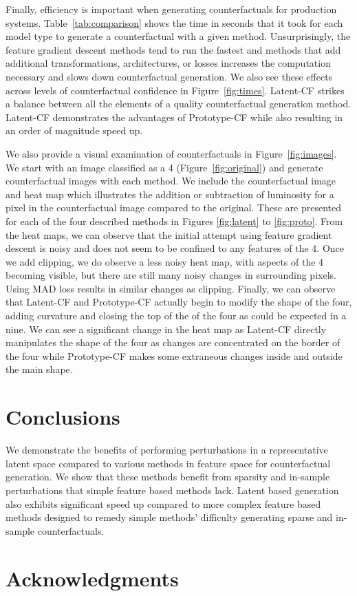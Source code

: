 \documentclass[letterpaper]{article} %
\begin{document}
Finally, efficiency is important when generating counterfactuals for production systems. Table~\ref{tab:comparison} shows the time in seconds that it took for each model type to generate a counterfactual with a given method. Unsurprisingly, the feature gradient descent methods tend to run the fastest and methods that add additional transformations, architectures, or losses increases the computation necessary and slows down counterfactual generation. We also see these effects across levels of counterfactual confidence in Figure~\ref{fig:times}. Latent-CF strikes a balance between all the elements of a quality counterfactual generation method. Latent-CF demonstrates the advantages of Prototype-CF while also resulting in an order of magnitude speed up.

We also provide a visual examination of counterfactuals in Figure~\ref{fig:images}. We start with an image classified as a 4 (Figure~\ref{fig:original}) and generate counterfactual images with each method. We include the counterfactual image and heat map which illustrates the addition or subtraction of luminosity for a pixel in the counterfactual image compared to the original. These are presented for each of the four described methods in Figures \ref{fig:latent} to \ref{fig:proto}. From the heat maps, we can observe that the initial attempt using feature gradient descent is noisy and does not seem to be confined to any features of the 4. Once we add clipping, we do observe a less noisy heat map, with aspects of the 4 becoming visible, but there are still many noisy changes in surrounding pixels. Using MAD loss results in similar changes as clipping. Finally, we can observe that Latent-CF and Prototype-CF actually begin to modify the shape of the four, adding curvature and closing the top of the of the four as could be expected in a nine. We can see a significant change in the heat map as Latent-CF directly manipulates the shape of the four as changes are concentrated on the border of the four while Prototype-CF makes some extraneous changes inside and outside the main shape. 


\section{Conclusions}
We demonstrate the benefits of performing perturbations in a representative latent space compared to various methods in feature space for counterfactual generation. We show that these methods benefit from sparsity and in-sample perturbations that simple feature based methods lack. Latent based generation also exhibits significant speed up compared to more complex feature based methods designed to remedy simple methods' difficulty generating sparse and in-sample counterfactuals.



\section{ Acknowledgments}


\end{document}
